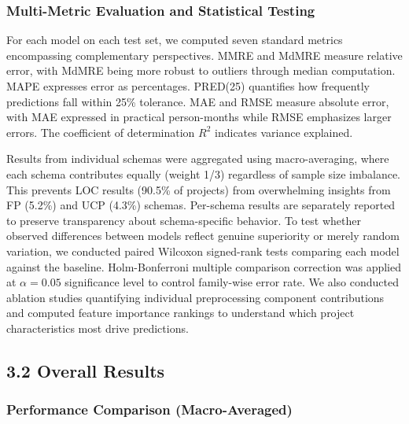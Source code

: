 \documentclass[11pt,a4paper]{article}
\begin{document}
\subsubsection{Multi-Metric Evaluation and Statistical Testing}

For each model on each test set, we computed seven standard metrics encompassing complementary perspectives. MMRE and MdMRE measure relative error, with MdMRE being more robust to outliers through median computation. MAPE expresses error as percentages. PRED(25) quantifies how frequently predictions fall within 25\% tolerance. MAE and RMSE measure absolute error, with MAE expressed in practical person-months while RMSE emphasizes larger errors. The coefficient of determination $R^2$ indicates variance explained.

Results from individual schemas were aggregated using macro-averaging, where each schema contributes equally (weight 1/3) regardless of sample size imbalance. This prevents LOC results (90.5\% of projects) from overwhelming insights from FP (5.2\%) and UCP (4.3\%) schemas. Per-schema results are separately reported to preserve transparency about schema-specific behavior. To test whether observed differences between models reflect genuine superiority or merely random variation, we conducted paired Wilcoxon signed-rank tests comparing each model against the baseline. Holm-Bonferroni multiple comparison correction was applied at $\alpha = 0.05$ significance level to control family-wise error rate. We also conducted ablation studies quantifying individual preprocessing component contributions and computed feature importance rankings to understand which project characteristics most drive predictions.

\subsection{3.2 Overall Results}

\subsubsection{Performance Comparison (Macro-Averaged)}
\end{document}
